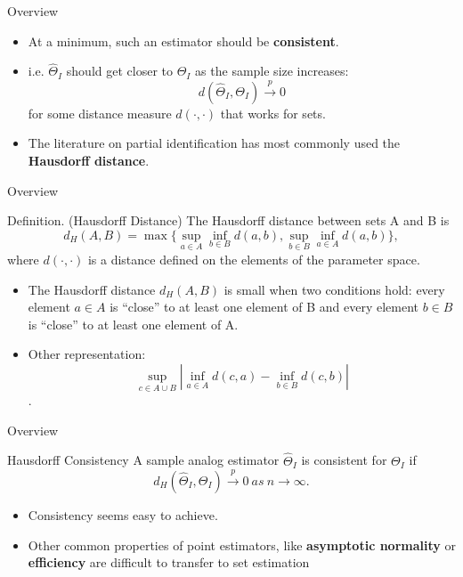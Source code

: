 \documentclass[aspectratio=169]{beamer}  %
\begin{document}
\begin{frame}{Overview}
    \begin{itemize}
        \item At a minimum, such an estimator should be \textbf{consistent}.
        \item i.e. $\hat{\Theta}_I$ should get closer to $\Theta_I$ as the sample size
        increases:$$d(\hat{\Theta}_I,\Theta_I)\overset{p}\to0$$ for some distance measure $d(\cdot,\cdot)$ that works for sets.
        \item The literature on partial identification has most commonly used the
        \textbf{Hausdorff distance}.
    \end{itemize}
\end{frame}

\begin{frame}{Overview}
    \begin{block}{Definition. (Hausdorff Distance)}
        The Hausdorff distance between sets A and B is $$d_H(A,B)=\max\{\sup_{a\in A} \inf_{b\in B}d(a,b),\sup_{b\in B} \inf_{a\in A}d(a,b)\},$$ where $d(\cdot,\cdot)$ is a distance defined on the elements of the parameter space.
    \end{block}

    \begin{itemize}
        \item The Hausdorff distance $d_H(A,B)$ is small when two conditions hold: every element $a \in A$ is “close” to at least one element of B and every element $b \in B$ is “close” to at least one element of A.
        \item Other representation:$$\sup_{c\in A\cup B}|\inf_{a\in A}d(c,a)-\inf_{b\in B}d(c,b)|$$.
    \end{itemize}
\end{frame}

\begin{frame}{Overview}
    \begin{block}{Hausdorff Consistency} 
        A sample analog estimator $\hat{\Theta}_I$ is consistent for $\Theta_I$ if $$d_H(\hat{\Theta}_I,\Theta_I)\stackrel{p}{\to}0~as~n\to\infty.$$
    \end{block}
    \begin{itemize}
        \item Consistency seems easy to achieve.
        \item Other common properties of point estimators, like \textbf{asymptotic
        normality} or \textbf{efficiency} are difficult to transfer to set estimation
    \end{itemize}
\end{frame}
\end{document}

